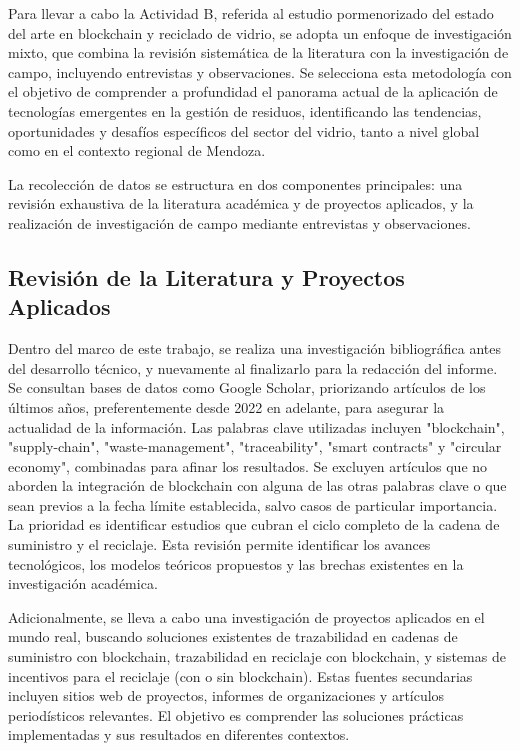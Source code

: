 Para llevar a cabo la Actividad B, referida al estudio pormenorizado del estado del arte en blockchain y reciclado de vidrio, se adopta un enfoque de investigación mixto, que combina la revisión sistemática de la literatura con la investigación de campo, incluyendo entrevistas y observaciones. Se selecciona esta metodología con el objetivo de comprender a profundidad el panorama actual de la aplicación de tecnologías emergentes en la gestión de residuos, identificando las tendencias, oportunidades y desafíos específicos del sector del vidrio, tanto a nivel global como en el contexto regional de Mendoza.

La recolección de datos se estructura en dos componentes principales: una revisión exhaustiva de la literatura académica y de proyectos aplicados, y la realización de investigación de campo mediante entrevistas y observaciones.

\subsection{Revisión de la Literatura y Proyectos Aplicados}

Dentro del marco de este trabajo, se realiza una investigación bibliográfica antes del desarrollo técnico, y nuevamente al finalizarlo para la redacción del informe. Se consultan bases de datos como Google Scholar, priorizando artículos de los últimos años, preferentemente desde 2022 en adelante, para asegurar la actualidad de la información. Las palabras clave utilizadas incluyen "blockchain", "supply-chain", "waste-management", "traceability", "smart contracts" y "circular economy", combinadas para afinar los resultados. Se excluyen artículos que no aborden la integración de blockchain con alguna de las otras palabras clave o que sean previos a la fecha límite establecida, salvo casos de particular importancia. La prioridad es identificar estudios que cubran el ciclo completo de la cadena de suministro y el reciclaje. Esta revisión permite identificar los avances tecnológicos, los modelos teóricos propuestos y las brechas existentes en la investigación académica.

Adicionalmente, se lleva a cabo una investigación de proyectos aplicados en el mundo real, buscando soluciones existentes de trazabilidad en cadenas de suministro con blockchain, trazabilidad en reciclaje con blockchain, y sistemas de incentivos para el reciclaje (con o sin blockchain). Estas fuentes secundarias incluyen sitios web de proyectos, informes de organizaciones y artículos periodísticos relevantes. El objetivo es comprender las soluciones prácticas implementadas y sus resultados en diferentes contextos.

